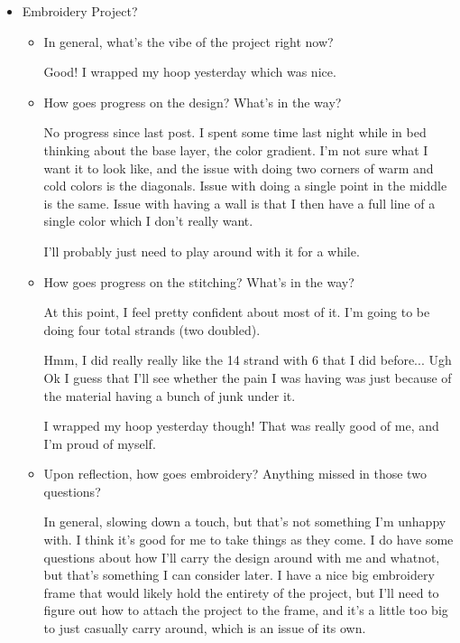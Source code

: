 \documentclass[12pt]{article}
\newcommand{\say}[1]{``#1''}
\renewcommand{\,}{\textsuperscript{,}}
\begin{document}
\begin{itemize}
\begin{itemize}
\begin{itemize}
But, it's something that I really admire.

\item Upon reflection, how goes music? Anything missed in those four questions?

I think that reflecting on music did a lot to help me feel more connected. I guess there's something to be said for \say{did I listen to the Jim Lill stuff?} but that's probably not something that I really care too deeply about.

\end{itemize}

\item Embroidery Project?

\begin{itemize}

\item In general, what's the vibe of the project right now?

Good! I wrapped my hoop yesterday which was nice.

\item How goes progress on the design? What's in the way?

No progress since last post. I spent some time last night while in bed thinking about the base layer, the color gradient.  
I'm not sure what I want it to look like, and the issue with doing two corners of warm and cold colors is the diagonals.  
Issue with doing a single point in the middle is the same.  
Issue with having a wall is that I then have a full line of a single color which I don't really want.

I'll probably just need to play around with it for a while.

\item How goes progress on the stitching? What's in the way?

At this point, I feel pretty confident about most of it. I'm going to be doing four total strands (two doubled).

Hmm, I did really really like the 14 strand with 6 that I did before... Ugh Ok I guess that I'll see whether the pain I was having was just because of the material having a bunch of junk under it.

I wrapped my hoop yesterday though! That was really good of me, and I'm proud of myself.

\item Upon reflection, how goes embroidery? Anything missed in those two questions?

In general, slowing down a touch, but that's not something I'm unhappy with. I think it's good for me to take things as they come. I do have some questions about how I'll carry the design around with me and whatnot, but that's something I can consider later.  
I have a nice big embroidery frame that would likely hold the entirety of the project, but I'll need to figure out how to attach the project to the frame, and it's a little too big to just casually carry around, which is an issue of its own.


\end{itemize}
\end{itemize}
\end{itemize}
\end{document}
